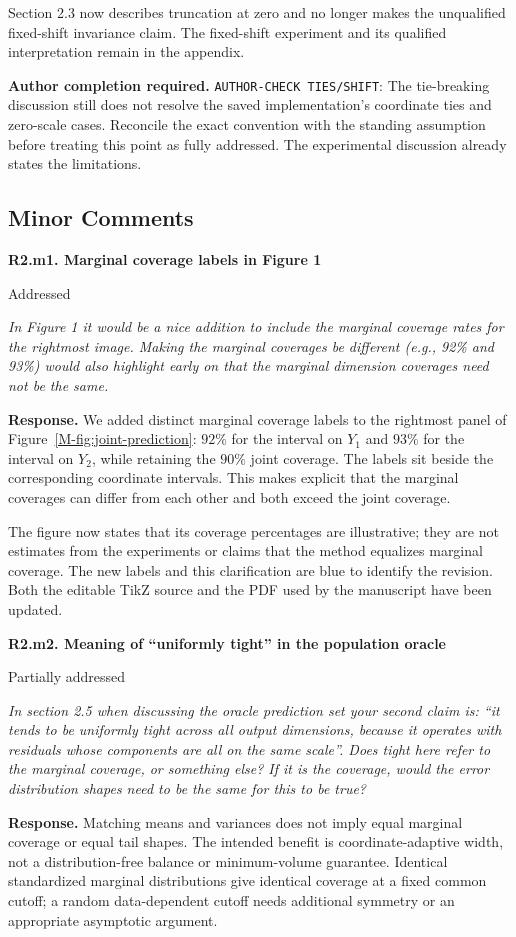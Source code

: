 \documentclass[11pt]{article}
\newcommand{\msfig}[1]{Figure~\ref*{M-#1}}
\newcommand{\action}[1]{\par{\small\color{ActionRed}\textbf{Author completion required.} #1\par}}
\newcommand{\point}[3]{\par\Needspace{7\baselineskip}\medskip
\noindent\parbox[t]{0.77\linewidth}{\textbf{#1}}\hfill
\parbox[t]{0.21\linewidth}{\raggedleft\small\sffamily #2}\par\nopagebreak
{\color{ReviewerBlue}\small\itshape #3\par}\textbf{Response.} }
\begin{document}
Section 2.3 now describes truncation at zero and no longer makes the unqualified fixed-shift invariance claim. The fixed-shift experiment and its qualified interpretation remain in the appendix.

\action{\texttt{AUTHOR-CHECK TIES/SHIFT}: The tie-breaking discussion still does not resolve the saved implementation's coordinate ties and zero-scale cases. Reconcile the exact convention with the standing assumption before treating this point as fully addressed. The experimental discussion already states the limitations.}

\subsection*{Minor Comments}

\point{R2.m1. Marginal coverage labels in Figure 1}{Addressed}{In Figure 1 it would be a nice addition to include the marginal
coverage rates for the rightmost image. Making the marginal
coverages be different (e.g., 92\% and 93\%) would also highlight
early on that the marginal dimension coverages need not be the same.}
\label{response:R2.m1}
We added distinct marginal coverage labels to the rightmost panel of \msfig{fig:joint-prediction}: $92\%$ for the interval on $Y_1$ and $93\%$ for the interval on $Y_2$, while retaining the $90\%$ joint coverage. The labels sit beside the corresponding coordinate intervals. This makes explicit that the marginal coverages can differ from each other and both exceed the joint coverage.

The figure now states that its coverage percentages are illustrative; they are not estimates from the experiments or claims that the method equalizes marginal coverage. The new labels and this clarification are blue to identify the revision. Both the editable TikZ source and the PDF used by the manuscript have been updated.

\point{R2.m2. Meaning of ``uniformly tight'' in the population oracle}{Partially addressed}{In section 2.5 when discussing the oracle prediction set your
second claim is: ``it tends to be uniformly tight across all
output dimensions, because it operates with residuals whose
components are all on the same scale''. Does tight here refer
to the marginal coverage, or something else? If it is the
coverage, would the error distribution shapes need to be the
same for this to be true?}
\label{response:R2.m2}
Matching means and variances does not imply equal marginal coverage or equal tail shapes. The intended benefit is coordinate-adaptive width, not a distribution-free balance or minimum-volume guarantee. Identical standardized marginal distributions give identical coverage at a fixed common cutoff; a random data-dependent cutoff needs additional symmetry or an appropriate asymptotic argument.
\end{document}
